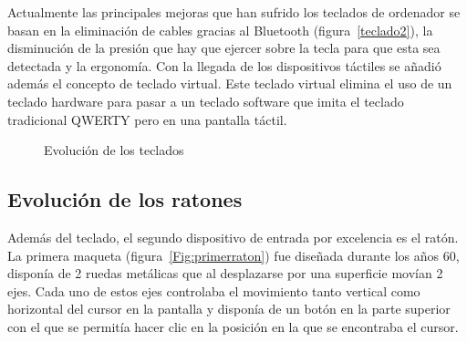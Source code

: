 Actualmente las principales mejoras que han sufrido los teclados de ordenador se basan en la eliminaci\'on de cables gracias al Bluetooth (figura~\ref{teclado2}), la disminuci\'on de la presi\'on que hay que ejercer sobre la tecla para que esta sea detectada y la ergonom\'ia. Con la llegada de los dispositivos t\'actiles se a\~nadi\'o adem\'as el concepto de teclado virtual. Este teclado virtual elimina el uso de un teclado hardware para pasar a un teclado software que imita el teclado tradicional QWERTY pero en una pantalla t\'actil. \\

\begin{figure}[t]
     \hfill
     \caption{Evoluci\'on de los teclados}
     \label{fig:primera}
   \end{figure}

\subsection{Evoluci\'on de los ratones}

Adem\'as del teclado, el segundo dispositivo de entrada por excelencia es el rat\'on. La primera maqueta (figura~\ref{Fig:primerraton}) fue dise\~nada durante los a\~nos 60, dispon\'ia de 2 ruedas met\'alicas que al desplazarse por una superficie mov\'ian 2 ejes. Cada uno de estos ejes controlaba el movimiento tanto vertical como horizontal del cursor en la pantalla y dispon\'ia de un bot\'on en la parte superior con el que se permit\'ia hacer clic en la posici\'on en la que se encontraba el cursor.\\

